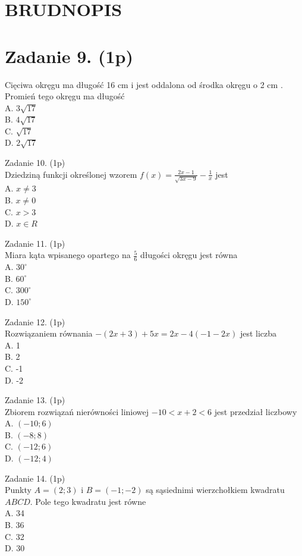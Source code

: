 \documentclass[10pt]{article}
\begin{document}
\section*{BRUDNOPIS}
\section*{Zadanie 9. (1p)}
Cięciwa okręgu ma długość 16 cm i jest oddalona od środka okręgu o 2 cm . Promień tego okręgu ma długość\\
A. \(3 \sqrt{17}\)\\
B. \(4 \sqrt{17}\)\\
C. \(\sqrt{17}\)\\
D. \(2 \sqrt{17}\)

Zadanie 10. (1p)\\
Dziedziną funkcji określonej wzorem \(f(x)=\frac{2 x-1}{\sqrt{3 x-9}}-\frac{1}{x}\) jest\\
A. \(x \neq 3\)\\
B. \(x \neq 0\)\\
C. \(x>3\)\\
D. \(x \in R\)

Zadanie 11. (1p)\\
Miara kąta wpisanego opartego na \(\frac{5}{6}\) długości okręgu jest równa\\
A. \(30^{\circ}\)\\
B. \(60^{\circ}\)\\
C. \(300^{\circ}\)\\
D. \(150^{\circ}\)

Zadanie 12. (1p)\\
Rozwiązaniem równania \(-(2 x+3)+5 x=2 x-4(-1-2 x)\) jest liczba\\
A. 1\\
B. 2\\
C. -1\\
D. -2

Zadanie 13. (1p)\\
Zbiorem rozwiązań nierówności liniowej \(-10<x+2<6\) jest przedział liczbowy\\
A. \((-10 ; 6)\)\\
B. \((-8 ; 8)\)\\
C. \((-12 ; 6)\)\\
D. \((-12 ; 4)\)

Zadanie 14. (1p)\\
Punkty \(A=(2 ; 3)\) i \(B=(-1 ;-2)\) są sąsiednimi wierzchołkiem kwadratu \(A B C D\). Pole tego kwadratu jest równe\\
A. 34\\
B. 36\\
C. 32\\
D. 30
\end{document}
